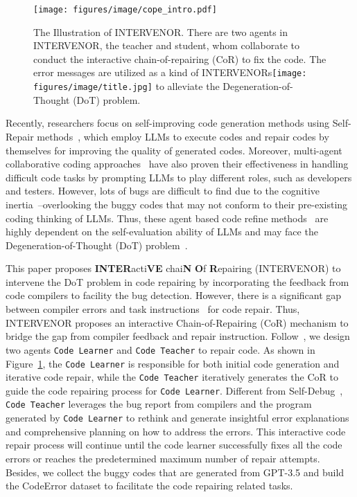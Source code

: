 \documentclass[11pt]{article}
\begin{document}
\begin{figure}[t] \centering
    \texttt{[image: figures/image/cope\_intro.pdf]}
    \caption{The Illustration of INTERVENOR. There are two agents in INTERVENOR, the teacher and student, whom collaborate to conduct the interactive chain-of-repairing (CoR) to fix the code. The error messages are utilized as a kind of INTERVENORs\texttt{[image: figures/image/title.jpg]} to alleviate the Degeneration-of-Thought (DoT) problem.} \label{fig:intro}
\end{figure} Recently, researchers focus on self-improving code generation methods using Self-Repair methods~\cite{Olausson2023IsSA,chen2023teaching}, which employ LLMs to execute codes and repair codes by themselves for improving the quality of generated codes. Moreover, multi-agent collaborative coding approaches~\cite{qian2023communicative,dong2023selfcollaboration} have also proven their effectiveness in handling difficult code tasks by prompting LLMs to play different roles, such as developers and testers. However, lots of bugs are difficult to find due to the cognitive inertia~\cite{mcguire1960cognitive}--overlooking the buggy codes that may not conform to their pre-existing coding thinking of LLMs. Thus, these agent
based code refine methods~\cite{dong2023selfcollaboration,qian2023communicative} are highly dependent on the self-evaluation ability of LLMs and may face the Degeneration-of-Thought (DoT) problem~\cite{liang2023encouraging,shinn2023reflexion}. 



This paper proposes \textbf{INTER}acti\textbf{VE} chai\textbf{N} \textbf{O}f \textbf{R}epairing (INTERVENOR) to intervene the DoT problem in code repairing by incorporating the feedback from code compilers to facility the bug detection. However, there is a significant gap between compiler errors and task instructions~\cite{wang2022self} for code repair. Thus, INTERVENOR proposes an interactive Chain-of-Repairing (CoR) mechanism to bridge the gap from compiler feedback and repair instruction. Follow~\citet{dong2023selfcollaboration}, we design two agents \texttt{Code Learner} and \texttt{Code Teacher} to repair code. As shown in Figure~\ref{fig:intro}, the \texttt{Code Learner} is responsible for both initial code generation and iterative code repair, while the \texttt{Code Teacher} iteratively generates the CoR to guide the code repairing process for \texttt{Code Learner}. Different from Self-Debug~\cite{chen2023teaching}, \texttt{Code Teacher} leverages the bug report from compilers and the program generated by \texttt{Code Learner} to rethink and generate insightful error explanations and comprehensive planning on how to address the errors. This interactive code repair process will continue until the code learner successfully fixes all the code errors or reaches the predetermined maximum number of repair attempts. Besides, we collect the buggy codes that are generated from GPT-3.5 and build the CodeError dataset to facilitate the code repairing related tasks.
\end{document}
